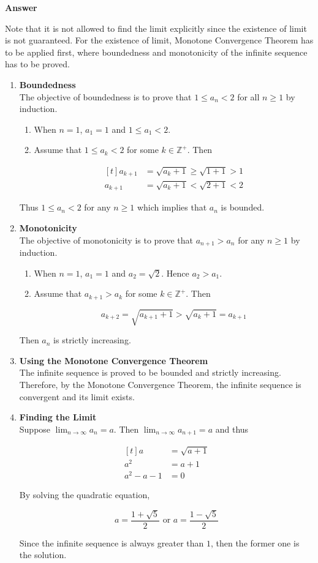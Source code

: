 \documentclass[a4paper,12pt]{article}
\newcommand{\s}{\vspace{1mm}}
\newcommand{\n}{\vspace{3mm}}
\newcommand{\Z}{\mathbb{Z}}
\newenvironment{block}[4][Block]{ %
\begin{list}{}{
  \setlength{\leftmargin}{0mm}
  \setlength{\rightmargin}{0mm}
  \setlength{\topsep}{0mm}
  \setlength{\partopsep}{0mm}
  \parsep\parskip
  \setlength{\itemsep}{-\parsep}
  }
  \needspace{\baselineskip}
  \item \textbf{#2 #3} \hspace{1mm} #4
  \vspace{1mm}
  \item
  }
{
\end{list}
}
\newenvironment{alist}{ %
\begin{enumerate}[label=(\alph*)]
}{
\end{enumerate}
}
\newenvironment{rlist}{ %
\begin{enumerate}[label=(\roman*)]
}{
\end{enumerate}
}
\begin{document}
\begin{block}{Answer}{}{}
 Note that it is not allowed to find the limit explicitly since the existence of limit is not guaranteed. For the existence of limit, Monotone Convergence Theorem has to be applied first, where boundedness and monotonicity of the infinite sequence has to be proved.\n

 \begin{alist}
  \item \textbf{Boundedness}\\
  The objective of boundedness is to prove that $1\leq a_{n}<2$ for all $n\geq 1$ by induction.\n
  \begin{rlist}
    \item When $n=1$, $a_{1}=1$ and $1\leq a_{1}<2$.
    \item Assume that $1\leq a_{k}<2$ for some $k\in \Z^{+}$. Then

    $$\begin{aligned}[t]
      a_{k+1}&=\sqrt{a_{k}+1}\geq \sqrt{1+1}>1\\
      a_{k+1}&=\sqrt{a_{k}+1}<\sqrt{2+1}<2
    \end{aligned}$$
  \end{rlist}
  Thus $1\leq a_{n}<2$ for any $n\geq 1$ which implies that $a_{n}$ is bounded.
  \item \textbf{Monotonicity}\\
  The objective of monotonicity is to prove that $a_{n+1}>a_{n}$ for any $n\geq 1$ by induction.\n
  \begin{rlist}
    \item When $n=1$, $a_{1}=1$ and $a_{2}=\sqrt{2}$. Hence $a_{2}>a_{1}$.
    \item Assume that $a_{k+1}>a_{k}$ for some $k\in \Z^{+}$. Then

    $$a_{k+2}=\sqrt{a_{k+1}+1}>\sqrt{a_{k}+1}=a_{k+1}$$
  \end{rlist}
  Then $a_{n}$ is strictly increasing.
  \item \textbf{Using the Monotone Convergence Theorem}\\
  The infinite sequence is proved to be bounded and strictly increasing. Therefore, by the Monotone Convergence Theorem, the infinite sequence is convergent and its limit exists.
  \item \textbf{Finding the Limit}\\
  Suppose $\lim_{n\to \infty}a_{n}=a$. Then $\lim_{n\to \infty}a_{n+1}=a$ and thus

  $$\begin{aligned}[t]
    a&=\sqrt{a+1}\\
    a^{2}&=a+1\\
    a^{2}-a-1&=0
  \end{aligned}$$\s

  By solving the quadratic equation,

  $$a=\frac{1+\sqrt{5}}{2}\text{ or }a=\frac{1-\sqrt{5}}{2}$$\s

  Since the infinite sequence is always greater than $1$, then the former one is the solution.
  \end{alist}
\end{block}
\end{document}
